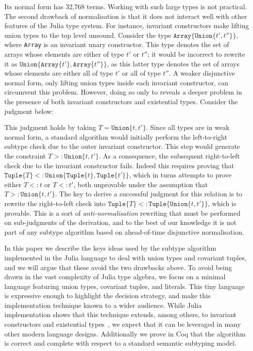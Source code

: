 \documentclass[a4paper,english]{lipics-v2019}
\newcommand{\xt}[1]{\texttt{#1}}
\newcommand{\union}[2]{\xt{Union\{}#1,#2\xt{\}}}
\newcommand{\tuple}[1]{\xt{Tuple\{}#1\xt{\}}}
\newcommand{\arrayt}[1]{\xt{Array\{}#1\xt{\}}}
\begin{document}
\noindent Its normal form has 32,768 terms. Working with such large types is
not practical.  The second drawback of normalisation is that it does not
interact well with other features of the Julia type system. For instance,
invariant constructors make lifting union types to the top level unsound.
Consider the type {\small \(\arrayt{\union{t'}{t''}}\)}, where {\small
  \texttt{Array}} is an invariant unary constructor.  This type denotes the
set of arrays whose elements are either of type {\small $t'$} or {\small
  $t''$}; it would be incorrect to rewrite it as {\small
  \(\union{\arrayt{t'}}{\arrayt{t''}}\)}, as this latter type denotes the
set of arrays whose elements are either all of type {\small $t'$} or all of
type {\small$t''$}.  A weaker disjunctive normal form, only lifting union
types inside each invariant constructor, can circumvent this
problem. However, doing so only to reveals a deeper problem in the presence
of both invariant constructors and {existential types}.  Consider the
judgment below:

%
\vspace{-3mm}{\small\[
  \arrayt{\union{\tuple{t}}{\tuple{t'}}} \ \ <:\ \ \exists T\,.\, \arrayt{\tuple{T}}
\]}\vspace{-3mm}
%

\noindent  This judgment holds by taking {\small$T=\union{t}{t'}$}.
Since all types are in weak normal form, a standard algorithm would
initially perform the left-to-right subtype check due to the outer invariant
constructor.  This step would generate the constraint
{\small$T>:\union{t}{t'}$}.  As a consequence, the subsequent right-to-left
check due to the invariant constructor fails.  Indeed this requires proving
that {\small$\tuple{T}<:\union{\tuple{t}}{\tuple{t'}}$}, which in turns
attempts to prove either {\small$T<:t$} or {\small$T<:t'$}, both unprovable
under the assumption that {\small$T>:\union{t}{t'}$}. The key to derive a
successful judgment for this relation is to rewrite the right-to-left check
into {\small$\tuple{T}<:\tuple{\union{t}{t'}}$}, which is provable. This is
a sort of \emph{anti-normalisation} rewriting that must be performed on
sub-judgments of the derivation, and to the best of our knowledge it is not
part of any subtype algorithm based on ahead-of-time disjunctive
normalisation.

In this paper we describe the keys ideas used by the subtype algorithm
implemented in the Julia language to deal with union types and covariant
tuples, and we will argue that these avoid the two drawbacks above.  To
avoid being drawn in the vast complexity of Julia type algebra, we focus on
a minimal language featuring union types, covariant tuples, and literals.
This tiny language is expressive enough to highlight the decision strategy,
and make this implementation technique known to a wider audience.  While
Julia implementation shows that this technique extends, among others, to
invariant constructors and existential types~\cite{DBLP:NardelliBPCBV18}, we
expect that it can be leveraged in many other modern language designs.
Additionally we prove in Coq that the algorithm is correct and complete with
respect to a standard semantic subtyping model.
\end{document}
